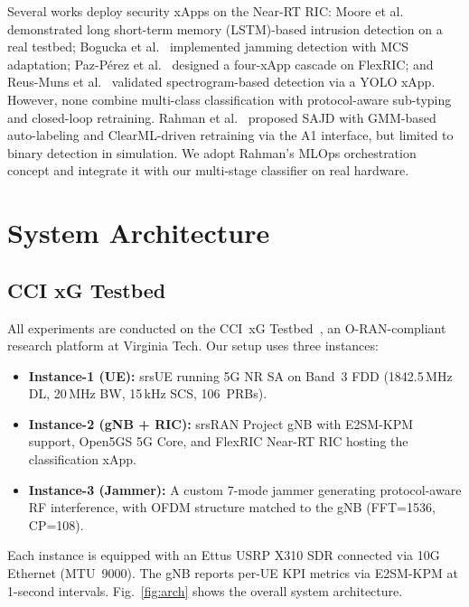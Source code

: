 \documentclass[conference]{IEEEtran}
\begin{document}
Several works deploy security xApps on the Near-RT RIC: Moore et al.~\cite{moore2025} demonstrated long short-term memory (LSTM)-based intrusion detection on a real testbed; Bogucka et al.~\cite{bogucka2025} implemented jamming detection with MCS adaptation; Paz-P\'{e}rez et al.~\cite{pazperez2025} designed a four-xApp cascade on FlexRIC; and Reus-Muns et al.~\cite{reusmuns2024} validated spectrogram-based detection via a YOLO xApp. However, none combine multi-class classification with protocol-aware sub-typing and closed-loop retraining. Rahman et al.~\cite{rahman2025} proposed SAJD with GMM-based auto-labeling and ClearML-driven retraining via the A1 interface, but limited to binary detection in simulation. We adopt Rahman's MLOps orchestration concept and integrate it with our multi-stage classifier on real hardware.


\section{System Architecture}
\label{sec:architecture}

\subsection{CCI xG Testbed}

All experiments are conducted on the CCI~xG Testbed~\cite{dasilva2025}, an O-RAN-compliant research platform at Virginia Tech. Our setup uses three instances:

\begin{itemize}
    \item \textbf{Instance-1 (UE):} srsUE running 5G NR SA on Band~3 FDD (1842.5\,MHz DL, 20\,MHz BW, 15\,kHz SCS, 106~PRBs).
    \item \textbf{Instance-2 (gNB + RIC):} srsRAN Project gNB with E2SM-KPM support, Open5GS 5G Core, and FlexRIC Near-RT RIC hosting the classification xApp.
    \item \textbf{Instance-3 (Jammer):} A custom 7-mode jammer generating protocol-aware RF interference, with OFDM structure matched to the gNB (FFT=1536, CP=108).
\end{itemize}

Each instance is equipped with an Ettus USRP X310 SDR connected via 10G Ethernet (MTU~9000). The gNB reports per-UE KPI metrics via E2SM-KPM at 1-second intervals. Fig.~\ref{fig:arch} shows the overall system architecture.
\end{document}
